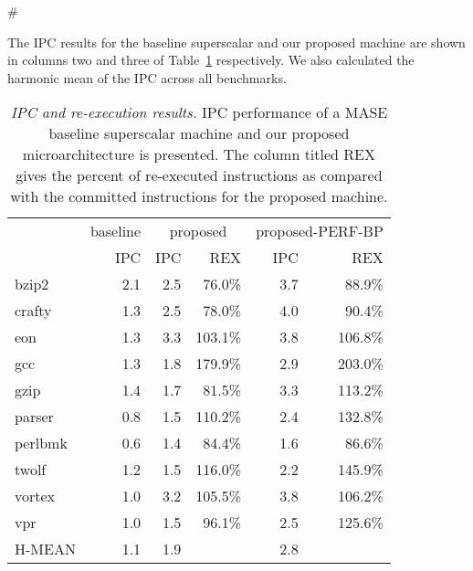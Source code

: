 #\documentclass[10pt,dvips]{article}
\begin{document}
The IPC results for the baseline superscalar and our proposed
machine are shown in columns two and three of Table~\ref{tab:results}
respectively.
We also calculated the harmonic mean of the IPC
across all benchmarks.
%
\begin{table}[p]
\begin{center}
\caption{{\em IPC and re-execution results.}
IPC performance of a MASE baseline superscalar machine and our
proposed microarchitecture is presented.
The column titled REX gives the percent of 
re-executed instructions as compared with the committed instructions
for the proposed machine.}
\label{tab:results}
\vspace{+0.1in}
\scriptsize {
\begin{tabular}{|l||r|r|r|r|r|}
\hline
 & baseline &
 \multicolumn{2}{c|}{proposed} &
 \multicolumn{2}{c|}{proposed-PERF-BP} \\
\cline{2-6}
 & IPC & IPC & REX & IPC & REX \\

\hline
bzip2&
2.1 & 2.5 & 76.0\% & 3.7 & 88.9\% \\

\hline
crafty&
1.3 & 2.5 & 78.0\% & 4.0 & 90.4\% \\

\hline
eon&
1.3 & 3.3 & 103.1\% & 3.8 & 106.8\% \\

\hline
gcc&
1.3 & 1.8 & 179.9\% & 2.9 & 203.0\% \\

\hline
gzip&
1.4 & 1.7 & 81.5\% & 3.3 & 113.2\% \\

\hline
parser&
0.8 & 1.5 & 110.2\% & 2.4 & 132.8\% \\

\hline
perlbmk&
0.6 & 1.4 & 84.4\% & 1.6 & 86.6\% \\

\hline
twolf&
1.2 & 1.5 & 116.0\% & 2.2 & 145.9\% \\

\hline
vortex&
1.0 & 3.2 & 105.5\% & 3.8 & 106.2\% \\

\hline
vpr&
1.0 & 1.5 & 96.1\% & 2.5 & 125.6\% \\

\hline
H-MEAN&
1.1 & 1.9 & & 2.8 & \\

\hline
\end{tabular}
}
\end{center}
\end{table}
\end{document}
